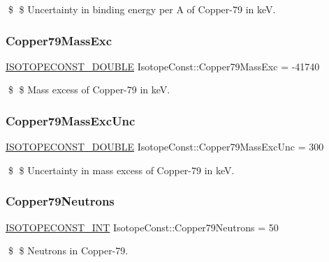 \$ \$ Uncertainty in binding energy per A of Copper-\/79 in keV. \mbox{\label{group___isotope_const-_copper-_cu79_ga69d79ff5f298885c3e8f0d6555070564}} 
\subsubsection{\texorpdfstring{Copper79\+Mass\+Exc}{Copper79MassExc}}
{\footnotesize\ttfamily \mbox{\hyperlink{group___isotope_const-_macros_ga8f45a7272ce02c0b4c65c44636ed719a}{I\+S\+O\+T\+O\+P\+E\+C\+O\+N\+S\+T\+\_\+\+D\+O\+U\+B\+LE}} Isotope\+Const\+::\+Copper79\+Mass\+Exc = -\/41740}

\$ \$ Mass excess of Copper-\/79 in keV. \mbox{\label{group___isotope_const-_copper-_cu79_ga69f815f30255654fdce150b11adcfeb5}} 
\subsubsection{\texorpdfstring{Copper79\+Mass\+Exc\+Unc}{Copper79MassExcUnc}}
{\footnotesize\ttfamily \mbox{\hyperlink{group___isotope_const-_macros_ga8f45a7272ce02c0b4c65c44636ed719a}{I\+S\+O\+T\+O\+P\+E\+C\+O\+N\+S\+T\+\_\+\+D\+O\+U\+B\+LE}} Isotope\+Const\+::\+Copper79\+Mass\+Exc\+Unc = 300}

\$ \$ Uncertainty in mass excess of Copper-\/79 in keV. \mbox{\label{group___isotope_const-_copper-_cu79_gaca10529b31b7eccc80030e0b9925e9f4}} 
\subsubsection{\texorpdfstring{Copper79\+Neutrons}{Copper79Neutrons}}
{\footnotesize\ttfamily \mbox{\hyperlink{group___isotope_const-_macros_ga5f18360b3e99483a35c32d789e62621c}{I\+S\+O\+T\+O\+P\+E\+C\+O\+N\+S\+T\+\_\+\+I\+NT}} Isotope\+Const\+::\+Copper79\+Neutrons = 50}

\$ \$ Neutrons in Copper-\/79. \mbox{\label{group___isotope_const-_copper-_cu79_gac22136e5e0079bea43af1339bd23c3d5}} 

